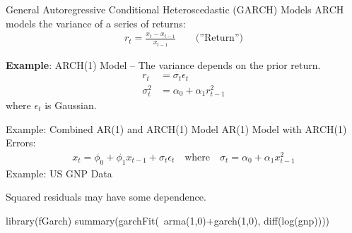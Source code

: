 \documentclass[ignorenonframetext,xcolor=x11names]{beamer}
\begin{document}



\begin{frame}{General Autoregressive Conditional Heteroscedastic (GARCH) Models}
ARCH models the variance of a series of returns:
\begin{align*}
r_t = \frac{x_t - x_{t-1}}{x_{t-1}} \qquad \text{(''Return'')}
\end{align*}

\textbf{Example}: ARCH(1) Model -- The variance depends on the prior return.
\begin{align*}
r_t &= \sigma_t \epsilon_t \\
\sigma_t^2 &= \alpha_0 + \alpha_1 r_{t-1}^2
\end{align*}
where $\epsilon_t$ is Gaussian. 
\end{frame}

\begin{frame}[fragile]{Example: Combined AR(1) and ARCH(1) Model}
AR(1) Model with ARCH(1) Errors:
\begin{align*}
x_t = \phi_0 + \phi_1 x_{t-1} + \sigma_t \epsilon_t \quad \text{where} \quad \sigma_t = \alpha_0 + \alpha_1 x_{t-1}^2
\end{align*} 
Example: US GNP Data
Squared residuals may have some dependence.
\begin{Rcode}
library(fGarch)
summary(garchFit(~arma(1,0)+garch(1,0), diff(log(gnp))))
\end{Rcode}
\end{frame}
\end{document}
